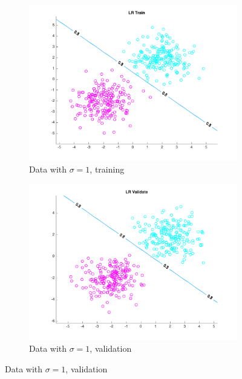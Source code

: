 \begin{figure}[h!]
\centering
    \begin{subfigure}[b]{0.4\textwidth}
	\includegraphics[scale=0.4]{hw2_1_stdev1_a.pdf}
	\caption{Data with $\sigma = 1$, training}\label{fig:data_stdev1a}
    \end{subfigure}
    \quad
    \begin{subfigure}[b]{0.4\textwidth}
	\includegraphics[scale=0.4]{hw2_1_stdev1_b.pdf}
	\caption{Data with $\sigma = 1$, validation}\label{fig:data_stdev1b}
    \end{subfigure}


\end{figure}
